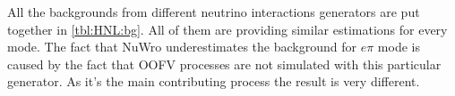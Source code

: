 \documentclass[../main.tex]{subfiles}
\begin{document}
\begin{comment}
\begin{table}[!ht]
\begin{tabular}{|c|l|r|r|r|r|r|r|r|r|r|r|r|}
  \hline
  N & Cut           &  CCQE   &  RES  &  DIS  &  COH  &  NC  &  2P2H  &  OOFV  &$\bar{\nu_{\mu}}$& $\nu_{e}$ & Total  & Eff\\
  \hline
  1 & Vertex        & 140.11  & 30.88 & 20.34 & 4.57  & 8.48 & 1.65   & 647.31 & 2.39            &  3.63     & 859.34 & 42.1 \\
  \hline
  2 & Veto          & 136.47  & 27.86 & 17.58 & 4.25  & 8.15 & 1.65   & 514.72 & 2.10            &  3.45     & 716.23 & 42.0 \\
  \hline
  3 & Use TPC       & 135.77  & 27.31 & 17.19 & 4.25  & 8.15 & 1.48   & 505.18 & 2.10            &  3.45     & 704.88 & 40.5 \\
  \hline
  4 & TPC act.      & 122.44  & 21.24 & 10.75 & 3.89  & 6.55 & 0.82   & 281.47 & 1.80            &  2.43     & 451.39 & 38.2 \\
  \hline
  5 & PID 1         & 121.90  & 17.97 & 9.27  & 3.54  & 4.19 & 0.82   & 134.29 & 1.36            &  0.54     & 284.87 & 33.6 \\
  \hline
  6 & PID 2         & 4.38    & 5.01  & 5.22  & 1.70  & 0.91 & 0.00   & 27.59  & 1.08            &  0.91     &  46.09 & 22.5 \\
  \hline
  7 & Use ECal      & 2.12    & 1.79  & 1.89  & 0.68  & 0.34 & 0.00   & 2.56   & 0.33            &  0.00     &  9.72  &  9.9  \\
  \hline
  8 & ECal MIP      & 1.09    & 0.55  & 1.31  & 0.51  & 0.00 & 0.00   & 1.08   & 0.16            &  0.00     &  4.71  &  9.3  \\
  \hline
  9 & $\theta$ cut  & 0.93    & 0.36  & 0.39  & 0.51  & 0.00 & 0.00   & 0.00   & 0.00            &  0.00     & 2.18   &  9.1 \\
  \hline

\end{tabular}
\caption{The number of MC background events after every cut for $10^{21} POT$ from NEUT for $\mu\mu\nu$ mode.}
\label{tbl:HNL:bgOrigDiMuon}
\end{table}
\end{comment}

All the backgrounds from different neutrino interactions generators are put together in \autoref{tbl:HNL:bg}. All of them are providing similar estimations for every mode. The fact that NuWro underestimates the background for $e\pi$ mode is caused by the fact that OOFV processes are not simulated with this particular generator. As it's the main contributing process the result is very different.
\end{document}
